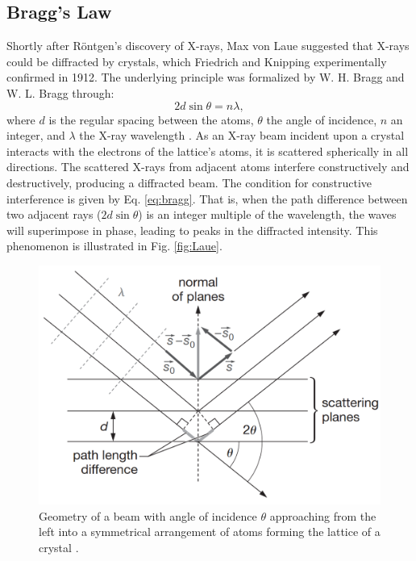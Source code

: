 \documentclass[aps,prb,twocolumn,superscriptaddress]{revtex4-2}
\begin{document}
\subsection{Bragg's Law}
Shortly after Röntgen's discovery of X-rays, Max von Laue suggested that X-rays
could be diffracted by crystals, which Friedrich and Knipping experimentally
confirmed in 1912. The underlying principle was formalized by W. H. Bragg and W.
L. Bragg through:
\begin{equation}\label{eq:bragg}
  2d\sin\theta = n\lambda,
\end{equation}
where $d$ is the regular spacing between the atoms, $\theta$ the angle of
incidence, $n$ an integer, and $\lambda$ the X-ray wavelength \cite{Bragg1913}.
As an X-ray beam incident upon a crystal interacts with the electrons of the
lattice's atoms, it is scattered spherically in all directions. The scattered
X-rays from adjacent atoms interfere constructively and destructively, producing
a diffracted beam. The condition for constructive interference is given by Eq.
\ref{eq:bragg}. That is, when the path difference between two adjacent rays
($2d\sin\theta$) is an integer multiple of the wavelength, the waves will
superimpose in phase, leading to peaks in the diffracted intensity. This
phenomenon is illustrated in Fig. \ref{fig:Laue}.

\begin{figure}[!h]
    \centering
    \includegraphics[width=0.9\linewidth]{Figures/Bragg_diffraction_2.svg.png}
    \caption{Geometry of a beam with angle of incidence $\theta$ approaching from the left
    into a symmetrical arrangement of atoms forming the lattice of a crystal \cite{Girolami}. }
    \label{fig:Bragg}
\end{figure}
\end{document}

